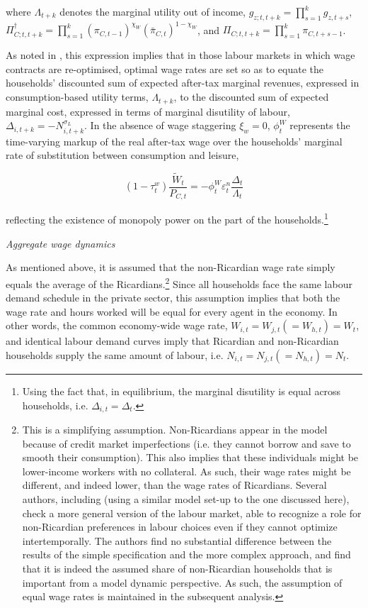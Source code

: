 \documentclass[a4paper,11pt]{article}
\numberwithin{equation}{section}
\begin{document}
	where $\Lambda_{t+k}$ denotes the marginal utility out of income, $g_{z;t,t+k}=\prod_{s=1}^{k}g_{z,t+s}$, $\Pi^{\dagger}_{C;t,t+k}=\prod_{s=1}^{k}\left(\pi_{C,t-1}\right)^{\chi_W}\left(\bar{\pi}_{C,t}\right)^{1-\chi_W}$, and $\Pi_{C;t,t+k}=\prod_{s=1}^{k}\pi_{C,t+s-1}$.
	
	As noted in \cite{christoffel2008}, this expression implies that in those labour markets in which wage contracts are re-optimised, optimal wage rates are set so as to equate the households' discounted sum of expected after-tax marginal revenues, expressed in consumption-based utility terms, $\Lambda_{t+k}$, to the discounted sum of expected marginal cost, expressed in terms of marginal disutility of labour, $\Delta_{i,t+k}=-N_{i,t+k}^{\sigma_L}$. In the absence of wage staggering $\xi_w=0$, $\phi_t^W$ represents the time-varying markup of the real after-tax wage over the households' marginal rate of substitution between consumption and leisure,
	
	\begin{equation}
	(1-\tau_t^w)\frac{\tilde{W}_t}{P_{C,t}}=-\phi_t^W\varepsilon_t^n\frac{\Delta_t}{\Lambda_t}
	\end{equation}
	
	reflecting the existence of monopoly power on the part of the households.\footnote{Using the fact that, in equilibrium, the marginal disutility is equal across households, i.e. $\Delta_{i,t}=\Delta_t$.}
	
	\vspace{8pt}
	\textit{Aggregate wage dynamics}
	\vspace{8pt}
	
	As mentioned above, it is assumed that the non-Ricardian wage rate simply equals the average of the Ricardians.\footnote{This is a simplifying assumption. Non-Ricardians appear in the model because of credit market imperfections (i.e. they cannot borrow and save to smooth their consumption). This also implies that these individuals might be lower-income workers with no collateral. As such, their wage rates might be different, and indeed lower, than  the wage rates of Ricardians. Several authors, including \cite{forni2009} (using a similar model set-up to the one discussed here), check a more general version of the labour market, able to recognize a role for non-Ricardian preferences in labour choices even if they cannot optimize intertemporally. The authors find no substantial difference between the results of the simple specification and the more complex approach, and find that it is indeed the assumed share of non-Ricardian households that is important from a model dynamic perspective. As such, the assumption of equal wage rates is maintained in the subsequent analysis.} Since all households face the same labour demand schedule in the private sector, this assumption implies that both the wage rate and hours worked will be equal for every agent in the economy. In other words, the common economy-wide wage rate, $W_{i,t}=W_{j,t}(=W_{h,t})=W_t$, and identical labour demand curves imply that Ricardian and non-Ricardian households supply the same amount of labour, i.e. $N_{i,t}=N_{j,t}(=N_{h,t})=N_t$. 
	
\end{document}

